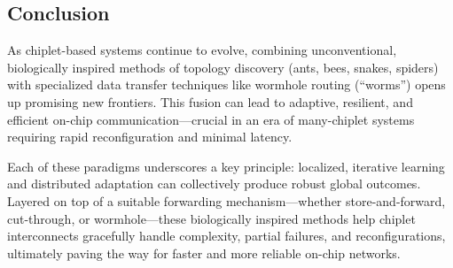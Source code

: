 \documentclass[../../../OAE-SPEC-MAIN.tex]{subfiles}
\begin{document}
\subsection*{Conclusion}

As chiplet-based systems continue to evolve, combining unconventional, biologically inspired methods of topology discovery (ants, bees, snakes, spiders) with specialized data transfer techniques like wormhole routing (“worms”) opens up promising new frontiers. This fusion can lead to adaptive, resilient, and efficient on-chip communication—crucial in an era of many-chiplet systems requiring rapid reconfiguration and minimal latency.

Each of these paradigms underscores a key principle: localized, iterative learning and distributed adaptation can collectively produce robust global outcomes. Layered on top of a suitable forwarding mechanism—whether store-and-forward, cut-through, or wormhole—these biologically inspired methods help chiplet interconnects gracefully handle complexity, partial failures, and reconfigurations, ultimately paving the way for faster and more reliable on-chip networks.
\end{document}

